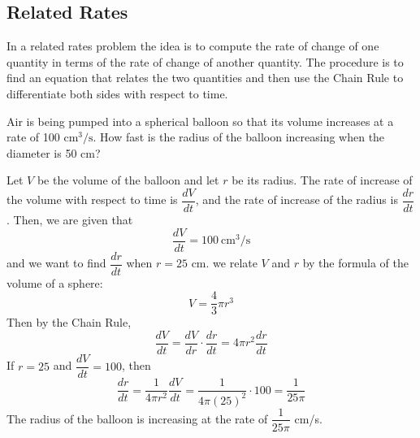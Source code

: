 \subsection{Related Rates}

In a related rates problem the idea is to compute the rate of change of one
quantity in terms of the rate of change of another quantity.
The procedure is to find an equation that relates the two quantities and then
use the Chain Rule to differentiate both sides with respect to time.
\begin{problem}
    Air is being pumped into a spherical balloon so that its volume increases
    at a rate of 100 \(\text{cm}^3/\text{s}\).
    How fast is the radius of the balloon increasing when the diameter is 50
    cm?
\end{problem}
\begin{solution}
    Let \(V\) be the volume of the balloon and let \(r\) be its radius.
    The rate of increase of the volume with respect to time is
    \(\dfrac{dV}{dt}\), and the rate of increase of the radius is
    \(\dfrac{dr}{dt}\).
    Then, we are given that
    \[\frac{dV}{dt}=100\ \text{cm}^3/\text{s}\]
    and we want to find \(\dfrac{dr}{dt}\) when \(r=25\) cm.
    we relate \(V\) and \(r\) by the formula of the volume of a sphere:
    \[V=\frac{4}{3}\pi r^3\]
    Then by the Chain Rule,
    \[\frac{dV}{dt}=\frac{dV}{dr}\cdot\frac{dr}{dt}=4\pi r^2\frac{dr}{dt}\]
    If \(r=25\) and \(\dfrac{dV}{dt}=100\), then
    \[\frac{dr}{dt}=\frac{1}{4\pi r^2}\frac{dV}{dt}
    =\frac{1}{4\pi(25)^2}\cdot100=\frac{1}{25\pi}\]
    The radius of the balloon is increasing at the rate of
    \(\dfrac{1}{25\pi}\) cm/s.
\end{solution}